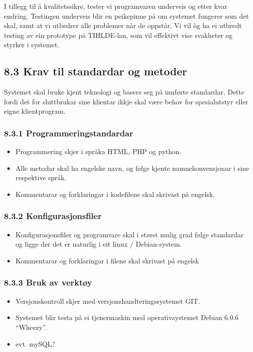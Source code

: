 \documentclass[12pt]{article}
\begin{document}
I tillegg til å kvalitetssikre, tester vi programvaren underveis og etter kvar endring. Testingen underveis blir en peikepinne på om systemet fungerer som det skal, samt at vi utbedrer alle problemer når de oppstår. Vi vil òg ha ei utbredt testing av ein prototype på TIHLDE{}-lan, som vil effektivt vise svakheter og styrker i systemet.

\subsection{8.3 Krav til standardar og metoder }

Systemet skal bruke kjent teknologi og basere seg på innførte standardar. Dette fordi det for sluttbrukar sine klientar ikkje skal være behov for spesialutstyr eller eigne klientprogram. 

\subsubsection{8.3.1 Programmeringstandardar}

\begin{itemize}
\item Programmering skjer i språka HTML, PHP og python.
\item Alle metodar skal ha engelske navn, og følge kjente namnekonvensjonar i sine respektive språk.
\item Kommentarar og forklaringar i kodefilene skal skrivast på engelsk.
\end{itemize}
\subsubsection{8.3.2 Konfigurasjonsfiler}

\begin{itemize}
\item Konfigurasjonsfiler og programvare skal i størst mulig grad følge standardar og ligge der det er naturlig i eit linux / Debian{}-system.
\item Kommentarar og forklaringar i filene skal skrivast på engelsk
\end{itemize}
\subsubsection{8.3.3 Bruk av verktøy}

\begin{itemize}
\item Versjonskontroll skjer med versjonshandteringssystemet GIT. 
\item Systemet blir testa på ei tjenermaskin med operativsystemet Debian 6.0.6 “Wheezy”. 
\item evt. mySQL?
\end{itemize}
\end{document}
